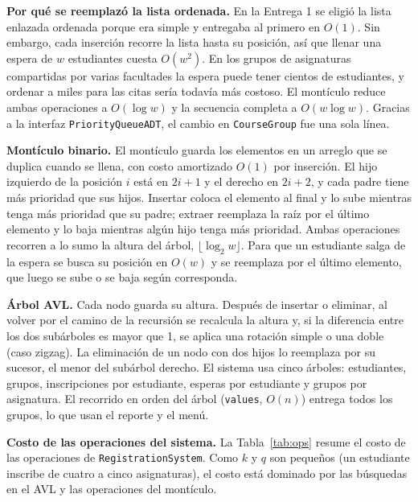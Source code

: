 \documentclass[conference]{IEEEtran}
\begin{document}
\textbf{Por qué se reemplazó la lista ordenada.} En la Entrega 1 se eligió la lista enlazada ordenada porque era simple y entregaba al primero en $O(1)$. Sin embargo, cada inserción recorre la lista hasta su posición, así que llenar una espera de $w$ estudiantes cuesta $O(w^2)$. En los grupos de asignaturas compartidas por varias facultades la espera puede tener cientos de estudiantes, y ordenar a miles para las citas sería todavía más costoso. El montículo reduce ambas operaciones a $O(\log w)$ y la secuencia completa a $O(w \log w)$. Gracias a la interfaz \texttt{PriorityQueueADT}, el cambio en \texttt{CourseGroup} fue una sola línea.

\textbf{Montículo binario.} El montículo guarda los elementos en un arreglo que se duplica cuando se llena, con costo amortizado $O(1)$ por inserción. El hijo izquierdo de la posición $i$ está en $2i+1$ y el derecho en $2i+2$, y cada padre tiene más prioridad que sus hijos. Insertar coloca el elemento al final y lo sube mientras tenga más prioridad que su padre; extraer reemplaza la raíz por el último elemento y lo baja mientras algún hijo tenga más prioridad. Ambas operaciones recorren a lo sumo la altura del árbol, $\lfloor \log_2 w \rfloor$. Para que un estudiante salga de la espera se busca su posición en $O(w)$ y se reemplaza por el último elemento, que luego se sube o se baja según corresponda.

\textbf{Árbol AVL.} Cada nodo guarda su altura. Después de insertar o eliminar, al volver por el camino de la recursión se recalcula la altura y, si la diferencia entre los dos subárboles es mayor que 1, se aplica una rotación simple o una doble (caso zigzag). La eliminación de un nodo con dos hijos lo reemplaza por su sucesor, el menor del subárbol derecho. El sistema usa cinco árboles: estudiantes, grupos, inscripciones por estudiante, esperas por estudiante y grupos por asignatura. El recorrido en orden del árbol (\texttt{values}, $O(n)$) entrega todos los grupos, lo que usan el reporte y el menú.

\textbf{Costo de las operaciones del sistema.} La Tabla~\ref{tab:ops} resume el costo de las operaciones de \texttt{RegistrationSystem}. Como $k$ y $q$ son pequeños (un estudiante inscribe de cuatro a cinco asignaturas), el costo está dominado por las búsquedas en el AVL y las operaciones del montículo.
\end{document}
